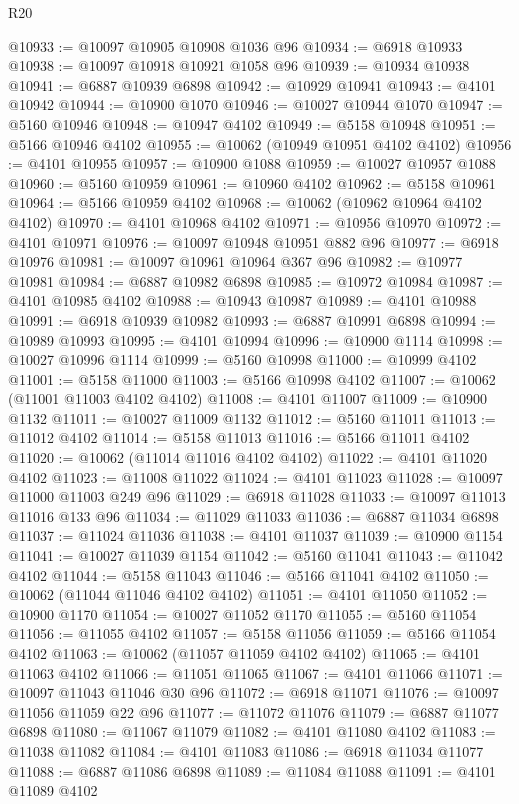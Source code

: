 \begin{lexlean}{R20}
\begin{coremodule}
@10933 := @10097 @10905 @10908 @1036 @96
@10934 := @6918 @10933
@10938 := @10097 @10918 @10921 @1058 @96
@10939 := @10934 @10938
@10941 := @6887 @10939 @6898
@10942 := @10929 @10941
@10943 := @4101 @10942
@10944 := @10900 @1070
@10946 := @10027 @10944 @1070
@10947 := @5160 @10946
@10948 := @10947 @4102
@10949 := @5158 @10948
@10951 := @5166 @10946 @4102
@10955 := @10062 (@10949 @10951 @4102 @4102)
@10956 := @4101 @10955
@10957 := @10900 @1088
@10959 := @10027 @10957 @1088
@10960 := @5160 @10959
@10961 := @10960 @4102
@10962 := @5158 @10961
@10964 := @5166 @10959 @4102
@10968 := @10062 (@10962 @10964 @4102 @4102)
@10970 := @4101 @10968 @4102
@10971 := @10956 @10970
@10972 := @4101 @10971
@10976 := @10097 @10948 @10951 @882 @96
@10977 := @6918 @10976
@10981 := @10097 @10961 @10964 @367 @96
@10982 := @10977 @10981
@10984 := @6887 @10982 @6898
@10985 := @10972 @10984
@10987 := @4101 @10985 @4102
@10988 := @10943 @10987
@10989 := @4101 @10988
@10991 := @6918 @10939 @10982
@10993 := @6887 @10991 @6898
@10994 := @10989 @10993
@10995 := @4101 @10994
@10996 := @10900 @1114
@10998 := @10027 @10996 @1114
@10999 := @5160 @10998
@11000 := @10999 @4102
@11001 := @5158 @11000
@11003 := @5166 @10998 @4102
@11007 := @10062 (@11001 @11003 @4102 @4102)
@11008 := @4101 @11007
@11009 := @10900 @1132
@11011 := @10027 @11009 @1132
@11012 := @5160 @11011
@11013 := @11012 @4102
@11014 := @5158 @11013
@11016 := @5166 @11011 @4102
@11020 := @10062 (@11014 @11016 @4102 @4102)
@11022 := @4101 @11020 @4102
@11023 := @11008 @11022
@11024 := @4101 @11023
@11028 := @10097 @11000 @11003 @249 @96
@11029 := @6918 @11028
@11033 := @10097 @11013 @11016 @133 @96
@11034 := @11029 @11033
@11036 := @6887 @11034 @6898
@11037 := @11024 @11036
@11038 := @4101 @11037
@11039 := @10900 @1154
@11041 := @10027 @11039 @1154
@11042 := @5160 @11041
@11043 := @11042 @4102
@11044 := @5158 @11043
@11046 := @5166 @11041 @4102
@11050 := @10062 (@11044 @11046 @4102 @4102)
@11051 := @4101 @11050
@11052 := @10900 @1170
@11054 := @10027 @11052 @1170
@11055 := @5160 @11054
@11056 := @11055 @4102
@11057 := @5158 @11056
@11059 := @5166 @11054 @4102
@11063 := @10062 (@11057 @11059 @4102 @4102)
@11065 := @4101 @11063 @4102
@11066 := @11051 @11065
@11067 := @4101 @11066
@11071 := @10097 @11043 @11046 @30 @96
@11072 := @6918 @11071
@11076 := @10097 @11056 @11059 @22 @96
@11077 := @11072 @11076
@11079 := @6887 @11077 @6898
@11080 := @11067 @11079
@11082 := @4101 @11080 @4102
@11083 := @11038 @11082
@11084 := @4101 @11083
@11086 := @6918 @11034 @11077
@11088 := @6887 @11086 @6898
@11089 := @11084 @11088
@11091 := @4101 @11089 @4102

\end{coremodule}
\end{lexlean}
